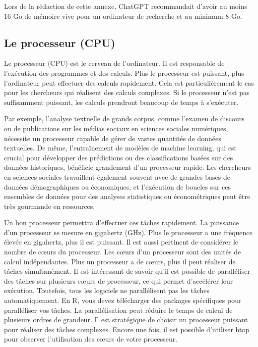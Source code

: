 \documentclass[
  letterpaper,
  DIV=11,
  numbers=noendperiod]{scrreprt}
\begin{document}
Lors de la rédaction de cette annexe, ChatGPT recommandait d'avoir au
moins 16 Go de mémoire vive pour un ordinateur de recherche et au
minimum 8 Go.

\hypertarget{le-processeur-cpu}{%
\subsection{Le processeur (CPU)}\label{le-processeur-cpu}}

Le processeur (CPU) est le cerveau de l'ordinateur. Il est responsable
de l'exécution des programmes et des calculs. Plus le processeur est
puissant, plus l'ordinateur peut effectuer des calculs rapidement. Cela
est particulièrement le cas pour les chercheurs qui réalisent des
calculs complexes. Si le processeur n'est pas suffisamment puissant, les
calculs prendront beaucoup de temps à s'exécuter.

Par exemple, l'analyse textuelle de grands corpus, comme l'examen de
discours ou de publications sur les médias sociaux en sciences sociales
numériques, nécessite un processeur capable de gérer de vastes quantités
de données textuelles. De même, l'entraînement de modèles de machine
learning, qui est crucial pour développer des prédictions ou des
classifications basées sur des données historiques, bénéficie grandement
d'un processeur rapide. Les chercheurs en sciences sociales travaillent
également souvent avec de grandes bases de données démographiques ou
économiques, et l'exécution de boucles sur ces ensembles de données pour
des analyses statistiques ou économétriques peut être très gourmande en
ressources.

Un bon processeur permettra d'effectuer ces tâches rapidement. La
puissance d'un processeur se mesure en gigahertz (GHz). Plus le
processeur a une fréquence élevée en gigahertz, plus il est puissant. Il
est aussi pertinent de considérer le nombre de cœurs du processeur. Les
cœurs d'un processeur sont des unités de calcul indépendantes. Plus un
processeur a de cœurs, plus il peut réaliser de tâches simultanément. Il
est intéressant de savoir qu'il est possible de paralléliser des tâches
sur plusieurs cœurs de processeur, ce qui permet d'accélérer leur
exécution. Toutefois, tous les logiciels ne parallélisent pas les tâches
automatiquement. En R, vous devez télécharger des packages spécifiques
pour paralléliser vos tâches. La parallélisation peut réduire le temps
de calcul de plusieurs ordres de grandeur. Il est stratégique de choisir
un processeur puissant pour réaliser des tâches complexes. Encore une
fois, il est possible d'utiliser htop pour observer l'utilisation des
cœurs de votre processeur.
\end{document}
